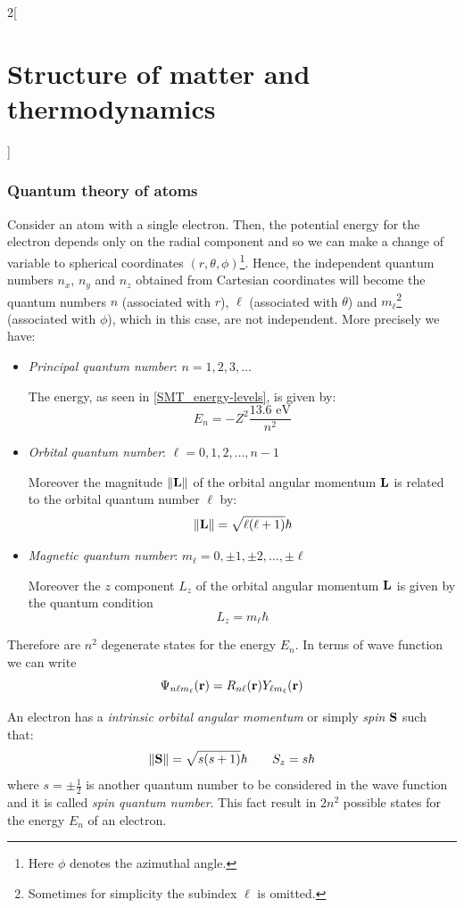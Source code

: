 \documentclass[../../../main.tex]{subfiles}
\begin{document}
\begin{multicols}{2}[\section{Structure of matter and thermodynamics}]
  \subsubsection{Quantum theory of atoms}
  \begin{definition}
    Consider an atom with a single electron. Then, the potential energy for the electron depends only on the radial component and so we can make a change of variable to spherical coordinates $(r,\theta,\phi)$\footnote{Here $\phi$ denotes the azimuthal angle.}. Hence, the independent quantum numbers $n_x$, $n_y$ and $n_z$ obtained from Cartesian coordinates will become the quantum numbers $n$ (associated with $r$), $\ell$ (associated with $\theta$) and $m_\ell$\footnote{Sometimes for simplicity the subindex $\ell$ is omitted.} (associated with $\phi$), which in this case, are not independent. More precisely we have:
    \begin{itemize}
      \item \emph{Principal quantum number}: $n=1,2,3,\ldots$\par
            The energy, as seen in \cref{SMT_energy-levels}, is given by: $$E_n=-Z^2\frac{13.6\text{ eV}}{n^2}$$
      \item \emph{Orbital quantum number}: $\ell=0,1,2,\ldots,n-1$\par Moreover the magnitude $\|\boldsymbol{\mathrm{L}}\|$ of the orbital angular momentum $\boldsymbol{\mathrm{L}}$ is related to the orbital quantum number $\ell$ by: $$\|\boldsymbol{\mathrm{L}}\|=\sqrt{\ell(\ell+1)}\hbar$$
      \item \emph{Magnetic quantum number}: $m_\ell=0,\pm 1,\pm 2,\ldots,\pm\ell$\par
            Moreover the $z$ component $L_z$ of the orbital angular momentum $\boldsymbol{\mathrm{L}}$ is given by the quantum condition $$L_z=m_\ell\hbar$$
    \end{itemize}
    Therefore are $n^2$ degenerate states for the energy $E_n$.
    In terms of wave function we can write $$\Psi_{n\ell m_\ell}(\boldsymbol{\mathrm{r}})=R_{n\ell}(\boldsymbol{\mathrm{r}})Y_{\ell m_\ell}(\boldsymbol{\mathrm{r}})$$
  \end{definition}
  \begin{definition}[Spin]
    An electron has a \emph{intrinsic orbital angular momentum} or simply \emph{spin} $\boldsymbol{\mathrm{S}}$ such that:
    $$\|\boldsymbol{\mathrm{S}}\|=\sqrt{s(s+1)}\hbar\qquad S_z=s\hbar$$ where $s=\pm\frac{1}{2}$ is another quantum number  to be considered in the wave function and it is called \emph{spin quantum number}. This fact result in $2n^2$ possible states for the energy $E_n$ of an electron.

\end{definition}
\end{multicols}
\end{document}
